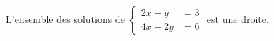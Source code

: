 L'ensemble des solutions de $\begin{cases}2x-y &= 3 \\ 4x-2y &= 6\end{cases}$ est une droite.

\begin{reponses}
\end{reponses}

